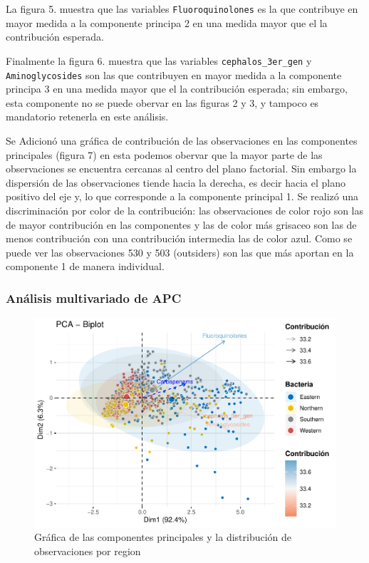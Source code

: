 \documentclass[
]{article}
\begin{document}
La figura 5. muestra que las variables \texttt{Fluoroquinolones} es la
que contribuye en mayor medida a la componente principa 2 en una medida
mayor que el la contribución esperada.

Finalmente la figura 6. muestra que las variables
\texttt{cephalos\_3er\_gen} y \texttt{Aminoglycosides} son las que
contribuyen en mayor medida a la componente principa 3 en una medida
mayor que el la contribución esperada; sin embargo, esta componente no
se puede obervar en las figuras 2 y 3, y tampoco es mandatorio retenerla
en este análisis.

Se Adicionó una gráfica de contribución de las observaciones en las
componentes principales (figura 7) en esta podemos obervar que la mayor
parte de las observaciones se encuentra cercanas al centro del plano
factorial. Sin embargo la dispersión de las observaciones tiende hacia
la derecha, es decir hacia el plano positivo del eje y, lo que
corresponde a la componente principal 1. Se realizó una discriminación
por color de la contribución: las observaciones de color rojo son las de
mayor contribución en las componentes y las de color más grisaceo son
las de menos contribución con una contribución intermedia las de color
azul. Como se puede ver las observaciones 530 y 503 (outsiders) son las
que más aportan en la componente 1 de manera individual.

\hypertarget{anuxe1lisis-multivariado-de-apc}{%
\subsubsection{Análisis multivariado de
APC}\label{anuxe1lisis-multivariado-de-apc}}

\begin{figure}
\centering
\includegraphics{2_actividad_PCA_files/figure-latex/GRÁFICA Biplot por región-1.pdf}
\caption{Gráfica de las componentes principales y la distribución de
observaciones por region}
\end{figure}
\end{document}
